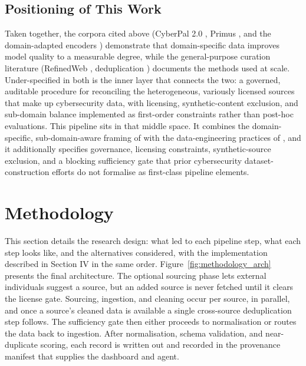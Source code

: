 \documentclass[conference]{IEEEtran}
\begin{document}
\subsection{Positioning of This Work}
Taken together, the corpora cited above (CyberPal 2.0 \cite{levi2025cyberpal}, Primus \cite{yu2025primus}, and the domain-adapted encoders \cite{aghaei2022securebert,bayer2024cysecbert}) demonstrate that domain-specific data improves model quality to a measurable degree, while the general-purpose curation literature (RefinedWeb \cite{penedo2023refinedweb}, deduplication \cite{lee2022deduplication,abbas2023semdedup}) documents the methods used at scale. Under-specified in both is the inner layer that connects the two: a governed, auditable procedure for reconciling the heterogeneous, variously licensed sources that make up cybersecurity data, with licensing, synthetic-content exclusion, and sub-domain balance implemented as first-order constraints rather than post-hoc evaluations. This pipeline sits in that middle space. It combines the domain-specific, sub-domain-aware framing of \cite{alsada2025attck,rani2024ttpxhunter,abdeen2023smet,park2023pretrained} with the data-engineering practices of \cite{penedo2023refinedweb,leskovec2014mmd}, and it additionally specifies governance, licensing constraints, synthetic-source exclusion, and a blocking sufficiency gate that prior cybersecurity dataset-construction efforts do not formalise as first-class pipeline elements.

\section{Methodology}

This section details the research design: what led to each pipeline step, what each step looks like, and the alternatives considered, with the implementation described in Section IV in the same order. Figure~\ref{fig:methodology_arch} presents the final architecture. The optional sourcing phase lets external individuals suggest a source, but an added source is never fetched until it clears the license gate. Sourcing, ingestion, and cleaning occur per source, in parallel, and once a source's cleaned data is available a single cross-source deduplication step follows. The sufficiency gate then either proceeds to normalisation or routes the data back to ingestion. After normalisation, schema validation, and near-duplicate scoring, each record is written out and recorded in the provenance manifest that supplies the dashboard and agent.
\end{document}
